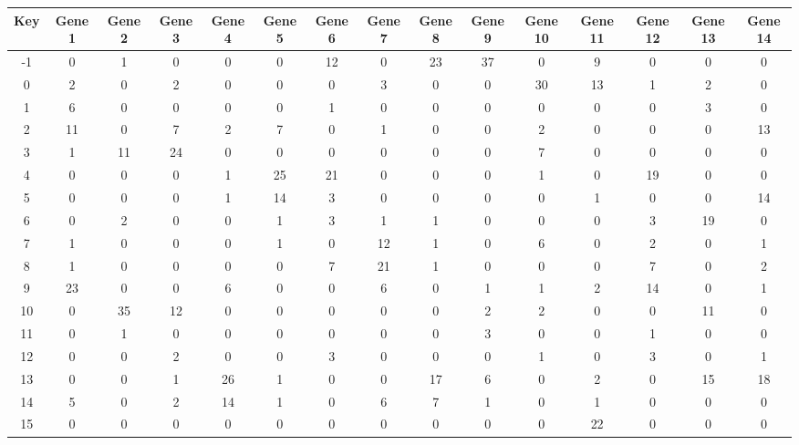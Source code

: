\begin{tabular}{|c|c|c|c|c|c|c|c|c|c|c|c|c|c|c|}
\hline
Key & Gene 1 & Gene 2 & Gene 3 & Gene 4 & Gene 5 & Gene 6 & Gene 7 & Gene 8 & Gene 9 & Gene 10 & Gene 11 & Gene 12 & Gene 13 & Gene 14 \\
\hline
-1 & 0 & 1 & 0 & 0 & 0 & 12 & 0 & 23 & 37 & 0 & 9 & 0 & 0 & 0 \\
0 & 2 & 0 & 2 & 0 & 0 & 0 & 3 & 0 & 0 & 30 & 13 & 1 & 2 & 0 \\
1 & 6 & 0 & 0 & 0 & 0 & 1 & 0 & 0 & 0 & 0 & 0 & 0 & 3 & 0 \\
2 & 11 & 0 & 7 & 2 & 7 & 0 & 1 & 0 & 0 & 2 & 0 & 0 & 0 & 13 \\
3 & 1 & 11 & 24 & 0 & 0 & 0 & 0 & 0 & 0 & 7 & 0 & 0 & 0 & 0 \\
4 & 0 & 0 & 0 & 1 & 25 & 21 & 0 & 0 & 0 & 1 & 0 & 19 & 0 & 0 \\
5 & 0 & 0 & 0 & 1 & 14 & 3 & 0 & 0 & 0 & 0 & 1 & 0 & 0 & 14 \\
6 & 0 & 2 & 0 & 0 & 1 & 3 & 1 & 1 & 0 & 0 & 0 & 3 & 19 & 0 \\
7 & 1 & 0 & 0 & 0 & 1 & 0 & 12 & 1 & 0 & 6 & 0 & 2 & 0 & 1 \\
8 & 1 & 0 & 0 & 0 & 0 & 7 & 21 & 1 & 0 & 0 & 0 & 7 & 0 & 2 \\
9 & 23 & 0 & 0 & 6 & 0 & 0 & 6 & 0 & 1 & 1 & 2 & 14 & 0 & 1 \\
10 & 0 & 35 & 12 & 0 & 0 & 0 & 0 & 0 & 2 & 2 & 0 & 0 & 11 & 0 \\
11 & 0 & 1 & 0 & 0 & 0 & 0 & 0 & 0 & 3 & 0 & 0 & 1 & 0 & 0 \\
12 & 0 & 0 & 2 & 0 & 0 & 3 & 0 & 0 & 0 & 1 & 0 & 3 & 0 & 1 \\
13 & 0 & 0 & 1 & 26 & 1 & 0 & 0 & 17 & 6 & 0 & 2 & 0 & 15 & 18 \\
14 & 5 & 0 & 2 & 14 & 1 & 0 & 6 & 7 & 1 & 0 & 1 & 0 & 0 & 0 \\
15 & 0 & 0 & 0 & 0 & 0 & 0 & 0 & 0 & 0 & 0 & 22 & 0 & 0 & 0 \\
\hline
\end{tabular}
